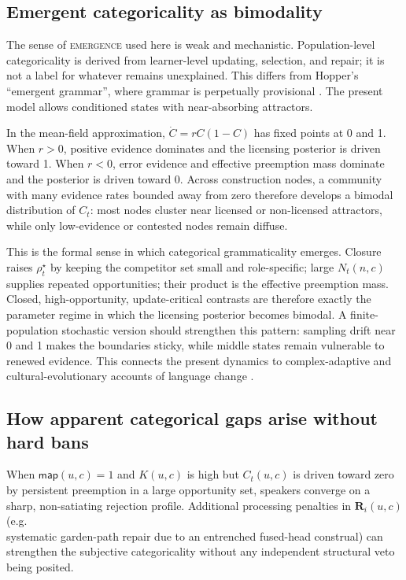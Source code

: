 \documentclass[12pt,letterpaper]{article}
\newcommand{\term}[1]{\textsc{#1}}
\begin{document}
\subsection{Emergent categoricality as bimodality}
\label{sec:emergent-categoricality}

The sense of \term{emergence} used here is weak and mechanistic. Population-level
categoricality is derived from learner-level updating, selection, and repair; it
is not a label for whatever remains unexplained. This differs from Hopper's
\enquote{emergent grammar}, where grammar is perpetually provisional
\autocite{hopper1987}. The present model allows conditioned states with
near-absorbing attractors.

In the mean-field approximation, $\dot{C}=rC(1-C)$ has fixed points at 0 and 1.
When $r>0$, positive evidence dominates and the licensing posterior is driven
toward 1. When $r<0$, error evidence and effective preemption mass dominate and
the posterior is driven toward 0. Across construction nodes, a community with
many evidence rates bounded away from zero therefore develops a bimodal
distribution of $C_t$: most nodes cluster near licensed or non-licensed
attractors, while only low-evidence or contested nodes remain diffuse.

This is the formal sense in which categorical grammaticality emerges. Closure
raises $\rho_t^\star$ by keeping the competitor set small and role-specific;
large $N_t(n,c)$ supplies repeated opportunities; their product is the effective
preemption mass. Closed, high-opportunity, update-critical contrasts are
therefore exactly the parameter regime in which the licensing posterior becomes
bimodal. A finite-population stochastic version should strengthen this pattern:
sampling drift near 0 and 1 makes the boundaries sticky, while middle states
remain vulnerable to renewed evidence. This connects the present dynamics to
complex-adaptive and cultural-evolutionary accounts of language change
\autocite{beckner2009,kirby2014,BlytheCroft2012}.%


\subsection{How apparent categorical gaps arise without hard bans}
\label{sec:categorical-without-bans}

When $\mathsf{map}(u,c)=1$ and $K(u,c)$ is high but $C_t(u,c)$ is driven toward zero by
persistent preemption in a large opportunity set, speakers converge on a sharp,
non-satiating rejection profile.  Additional processing penalties in $\mathbf{R}_i(u,c)$
(e.g.\\ systematic garden-path repair due to an entrenched fused-head construal) can strengthen
the subjective categoricality without any independent structural veto being posited.
\end{document}
